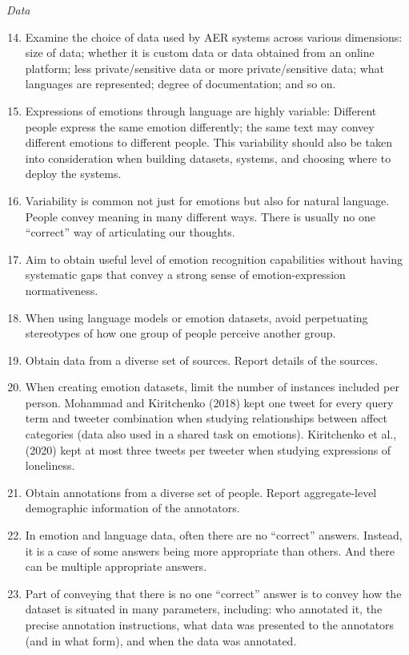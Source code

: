 \documentclass{clv3}
\begin{document}
{\noindent \textit{Data}
\begin{enumerate}
  \setcounter{enumi}{13}
\item Examine the choice of data used by AER systems across various dimensions: size of data; whether it is custom data or data obtained from an online platform; less private/sensitive data or more private/sensitive data; what languages are represented; degree of documentation; and so on. %
\item Expressions of emotions through language are highly variable: Different people express the same emotion differently; the same text may convey different emotions to different people. This variability should also be taken into consideration when building datasets, systems, and choosing where to deploy the systems. %
\item Variability is common not just for emotions but also for natural language. People convey meaning in many different ways. There is usually no one “correct” way of articulating our thoughts.
\item Aim to obtain useful level of emotion recognition capabilities without having systematic gaps that convey a strong sense of emotion-expression normativeness.
\item When using language models or emotion datasets, avoid perpetuating stereotypes of how one group of people perceive another group.
\item Obtain data from a diverse set of sources. Report details of the sources.
\item When creating emotion datasets, limit the number of instances included per person. Mohammad and Kiritchenko (2018) kept one tweet for every query term and tweeter combination when studying relationships between affect categories (data also used in a shared task on emotions). Kiritchenko et al., (2020) kept at most three tweets per tweeter when studying expressions of loneliness.
\item Obtain annotations from a diverse set of people. Report aggregate-level demographic information of the annotators.
\item In emotion and language data, often there are no “correct” answers. Instead, it is a case of some answers being more appropriate than others. And there can be multiple appropriate answers.
\item Part of conveying that there is no one “correct” answer is to convey how the dataset is situated in many parameters, including: who annotated it, the precise annotation instructions, what data was presented to the annotators (and in what form), and when the data was annotated.

\end{enumerate}}
\end{document}
